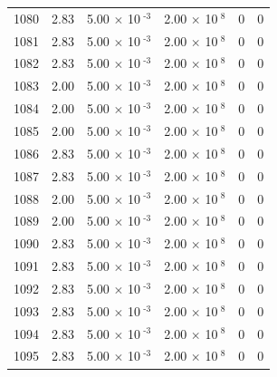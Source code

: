 \documentclass[a4paper,11pt]{article}
\begin{document}
\begin{center}
\begin{longtable}{|R{1.5cm}|R{2.4cm}|R{2.4cm}|R{2.4cm}|R{2.4cm}|R{2.4cm}|}
 1080 &   2.83  &         5.00 $\times$ 10$^{\text{          -3}}$  &         2.00 $\times$ 10$^{\text{           8}}$  & 0  & 0 \\
 1081 &   2.83  &         5.00 $\times$ 10$^{\text{          -3}}$  &         2.00 $\times$ 10$^{\text{           8}}$  & 0  & 0 \\
 1082 &   2.83  &         5.00 $\times$ 10$^{\text{          -3}}$  &         2.00 $\times$ 10$^{\text{           8}}$  & 0  & 0 \\
 1083 &   2.00  &         5.00 $\times$ 10$^{\text{          -3}}$  &         2.00 $\times$ 10$^{\text{           8}}$  & 0  & 0 \\
 1084 &   2.00  &         5.00 $\times$ 10$^{\text{          -3}}$  &         2.00 $\times$ 10$^{\text{           8}}$  & 0  & 0 \\
 1085 &   2.00  &         5.00 $\times$ 10$^{\text{          -3}}$  &         2.00 $\times$ 10$^{\text{           8}}$  & 0  & 0 \\
 1086 &   2.83  &         5.00 $\times$ 10$^{\text{          -3}}$  &         2.00 $\times$ 10$^{\text{           8}}$  & 0  & 0 \\
 1087 &   2.83  &         5.00 $\times$ 10$^{\text{          -3}}$  &         2.00 $\times$ 10$^{\text{           8}}$  & 0  & 0 \\
 1088 &   2.00  &         5.00 $\times$ 10$^{\text{          -3}}$  &         2.00 $\times$ 10$^{\text{           8}}$  & 0  & 0 \\
 1089 &   2.00  &         5.00 $\times$ 10$^{\text{          -3}}$  &         2.00 $\times$ 10$^{\text{           8}}$  & 0  & 0 \\
 1090 &   2.83  &         5.00 $\times$ 10$^{\text{          -3}}$  &         2.00 $\times$ 10$^{\text{           8}}$  & 0  & 0 \\
 1091 &   2.83  &         5.00 $\times$ 10$^{\text{          -3}}$  &         2.00 $\times$ 10$^{\text{           8}}$  & 0  & 0 \\
 1092 &   2.83  &         5.00 $\times$ 10$^{\text{          -3}}$  &         2.00 $\times$ 10$^{\text{           8}}$  & 0  & 0 \\
 1093 &   2.83  &         5.00 $\times$ 10$^{\text{          -3}}$  &         2.00 $\times$ 10$^{\text{           8}}$  & 0  & 0 \\
 1094 &   2.83  &         5.00 $\times$ 10$^{\text{          -3}}$  &         2.00 $\times$ 10$^{\text{           8}}$  & 0  & 0 \\
 1095 &   2.83  &         5.00 $\times$ 10$^{\text{          -3}}$  &         2.00 $\times$ 10$^{\text{           8}}$  & 0  & 0 \\

\end{longtable}
\end{center}
\end{document}
